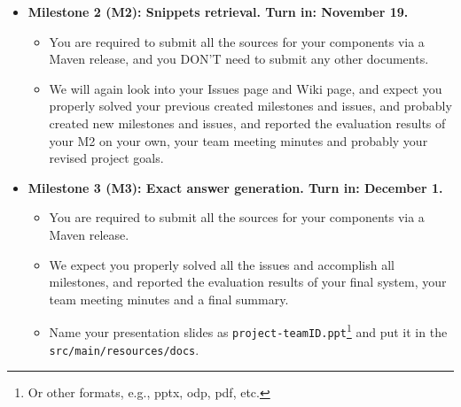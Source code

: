\documentclass[oneside]{memoir}
\begin{document}
\begin{titlingpage}
\begin{minipage}{1.2\textwidth}
\begin{itemize}
\begin{itemize}
\end{itemize}

\item \textbf{Milestone 2 (M2): Snippets retrieval. Turn in: November 19.}

\begin{itemize}

\item You are required to submit all the sources for your components via a Maven release, and you DON'T need to submit any other documents. 

\item We will again look into your Issues page and Wiki page, and expect you
properly solved your previous created milestones and issues, and probably
created new milestones and issues, and reported the evaluation results of your
M2 on your own, your team meeting minutes and probably your revised project
goals.

\end{itemize}

\end{itemize}

\end{minipage}
\hspace{-0.1\textwidth}

\hspace{-0.1\textwidth}
\begin{minipage}{1.2\textwidth}

\begin{itemize}

\item \textbf{Milestone 3 (M3): Exact answer generation. Turn in: December 1.}

\begin{itemize} 

\item You are required to submit all the sources for your components via a Maven release.

\item We expect you properly solved all the issues and accomplish all
milestones, and reported the evaluation results of your final system, your team
meeting minutes and a final summary.

\item Name your presentation slides as
\texttt{project-teamID.ppt}\footnote{Or other formats, e.g., pptx, odp, pdf, etc.}
and put it in the \texttt{src/main/resources/docs}.

\end{itemize}


\end{itemize}
\end{minipage}
\end{titlingpage}
\end{document}
